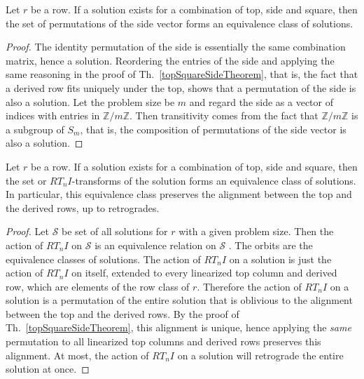 \begin{corollary}
	\label{topSquareSideCorollary}
	Let $r$ be a row. If a solution exists for a combination of top, side and square, then the set of permutations of the side vector forms an equivalence class of solutions.
	\begin{proof}
		The identity permutation of the side is essentially the same combination matrix, hence a solution. Reordering the entries of the side and applying the same reasoning in the proof of Th.~\ref{topSquareSideTheorem}, that is, the fact that a derived row fits uniquely under the top, shows that a permutation of the side is also a solution. Let the problem size be $m$ and regard the side as a vector of indices with entries in $\mathbb{Z} / m \mathbb{Z}$. Then transitivity comes from the fact that $\mathbb{Z} / m \mathbb{Z}$ is a subgroup of $S_m$, that is, the composition of permutations of the side vector is also a solution.
	\end{proof}
\end{corollary}

\begin{corollary}
	Let $r$ be a row. If a solution exists for a combination of top, side and square, then the set or $RT_nI$-transforms of the solution forms an equivalence class of solutions. In particular, this equivalence class preserves the alignment between the top and the derived rows, up to retrogrades.
    \begin{proof}
    Let $\mathcal{S}$ be set of all solutions for $r$ with a given problem size. Then the action of $RT_nI$ on $\mathcal{S}$ is an equivalence relation on $\mathcal{S}$ \cite[102]{Rotman1967} \cite[114]{DummitFoote2004} \cite[250]{Tucker1974}. The orbits are the equivalence classes of solutions. The action of $RT_nI$ on a solution is just the action of $RT_nI$ on itself, extended to every linearized top column and derived row, which are elements of the row class of $r$. Therefore the action of $RT_nI$ on a solution is a permutation of the entire solution that is oblivious to the alignment between the top and the derived rows. By the proof of Th.~\ref{topSquareSideTheorem}, this alignment is unique, hence applying the \emph{same} permutation to all linearized top columns and derived rows preserves this alignment. At most, the action of $RT_nI$ on a solution will retrograde the entire solution at once.
    \end{proof}
\end{corollary}

